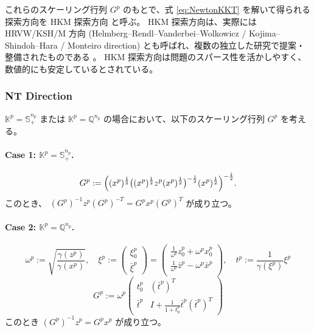 \documentclass{jsarticle}
\begin{document}
\medskip

これらのスケーリング行列 $G^p$ のもとで、式 \eqref{eq:NewtonKKT} を解いて得られる探索方向を HKM 探索方向 と呼ぶ。
HKM 探索方向は、実際には HRVW/KSH/M 方向 (Helmberg--Rendl--Vanderbei--Wolkowicz / Kojima--Shindoh--Hara / Monteiro direction) 
とも呼ばれ、複数の独立した研究で提案・整備されたものである \cite{Kojima1997,Monteiro1997}。
HKM 探索方向は問題のスパース性を活かしやすく、数値的にも安定しているとされている。


\subsubsection{NT Direction}

$\mathbb{K}^p = \mathbb{S}^{n_p}_+$ または $\mathbb{K}^p = \mathbb{Q}^{n_p}$ の場合において、以下のスケーリング行列 $G^p$ を考える。

\paragraph{Case 1: \(\mathbb{K}^p = \mathbb{S}^{n_p}_+\).}
\[
  G^p 
  := 
    \Bigl( (x^p)^{\frac12} \bigl( (x^p)^{\frac12} z^p (x^p)^{\frac12} \bigr)^{-\frac12} (x^p)^{\frac12} \Bigr)^{-\frac12}.
\]
このとき、 $(G^p)^{-1} z^p (G^p)^{-T} = G^p x^p (G^p)^T$ が成り立つ。

\paragraph{Case 2: \(\mathbb{K}^p = \mathbb{Q}^{n_p}\).}
\begin{equation}
    \omega^p := \sqrt{\frac{\gamma(z^p)}{\gamma(x^p)}}, 
    \quad 
    \xi^p 
    := \begin{pmatrix} \xi^p_0 \\ \bar{\xi}^p \end{pmatrix} 
    = \begin{pmatrix}
        \frac{1}{\omega^p} z^p_0 + \omega^p x^p_0 \\
        \frac{1}{\omega^p} \bar{z}^p - \omega^p \bar{x}^p \\
    \end{pmatrix},
    \quad
    t^p := \frac{1}{\gamma(\xi^p)}\xi^p
    \label{eq:scaling_mat_NT_socp_aux}
\end{equation}
\begin{equation}
    G^p := \omega^p \begin{pmatrix}
        t^p_0 & (\bar{t}^p)^T \\
        \bar{t}^p & I+\frac{1}{1 + t^p_0} \bar{t}^p(\bar{t}^p)^T
    \end{pmatrix}
    \label{eq:scaling_mat_NT_socp}
\end{equation}
このとき $(G^p)^{-1} z^p = G^p x^p$ が成り立つ。
\end{document}

